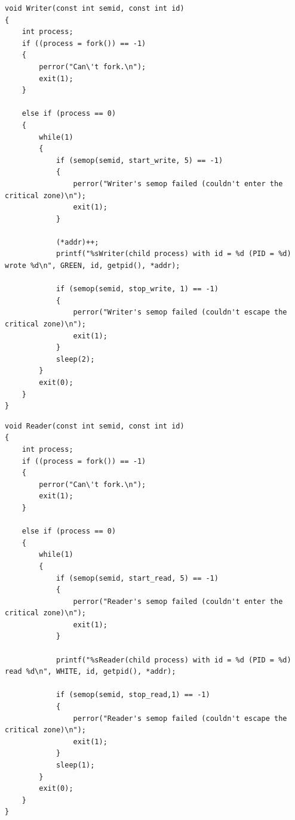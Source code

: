 \documentclass[12pt]{report}
\begin{document}
\begin{lstlisting}[label=some-code,caption=Код подпрограммы Writer() - процесс писатель]
void Writer(const int semid, const int id)
{
    int process;
    if ((process = fork()) == -1)
    {
        perror("Can\'t fork.\n");
        exit(1);
    }
    
    else if (process == 0)
    {
        while(1)
        {
            if (semop(semid, start_write, 5) == -1)
            {
                perror("Writer's semop failed (couldn't enter the critical zone)\n");
                exit(1);
            }
            
            (*addr)++;
            printf("%sWriter(child process) with id = %d (PID = %d) wrote %d\n", GREEN, id, getpid(), *addr);
            
            if (semop(semid, stop_write, 1) == -1)
            {
                perror("Writer's semop failed (couldn't escape the critical zone)\n");
                exit(1);
            }
            sleep(2);
        }
        exit(0);
    }
}
\end{lstlisting}

\begin{lstlisting}[label=some-code,caption=Код подпрограммы Reader() - процесс читатель]
void Reader(const int semid, const int id)
{
    int process;
    if ((process = fork()) == -1)
    {
        perror("Can\'t fork.\n");
        exit(1);
    }
    
    else if (process == 0)
    {
        while(1)
        {
            if (semop(semid, start_read, 5) == -1)
            {
                perror("Reader's semop failed (couldn't enter the critical zone)\n");
                exit(1);
            }
            
            printf("%sReader(child process) with id = %d (PID = %d) read %d\n", WHITE, id, getpid(), *addr);
            
            if (semop(semid, stop_read,1) == -1)
            {
                perror("Reader's semop failed (couldn't escape the critical zone)\n");
                exit(1);
            }
            sleep(1);
        }
        exit(0);
    }
}
\end{lstlisting}
\end{document}
